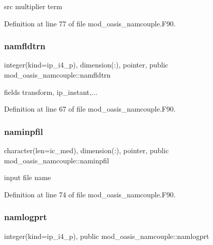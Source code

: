 src multiplier term 



Definition at line 77 of file mod\+\_\+oasis\+\_\+namcouple.\+F90.

\mbox{\label{namespacemod__oasis__namcouple_a5f81bc00e6dc045770edd4093f68278c}} 
\subsubsection{\texorpdfstring{namfldtrn}{namfldtrn}}
{\footnotesize\ttfamily integer(kind=ip\+\_\+i4\+\_\+p), dimension(\+:), pointer, public mod\+\_\+oasis\+\_\+namcouple\+::namfldtrn}



fields transform, ip\+\_\+instant,... 



Definition at line 67 of file mod\+\_\+oasis\+\_\+namcouple.\+F90.

\mbox{\label{namespacemod__oasis__namcouple_a15fc11ff1c1d5718ff127a06a205a82c}} 
\subsubsection{\texorpdfstring{naminpfil}{naminpfil}}
{\footnotesize\ttfamily character(len=ic\+\_\+med), dimension(\+:), pointer, public mod\+\_\+oasis\+\_\+namcouple\+::naminpfil}



input file name 



Definition at line 74 of file mod\+\_\+oasis\+\_\+namcouple.\+F90.

\mbox{\label{namespacemod__oasis__namcouple_a46affda5336f60a1eeb1badaaccd3cfd}} 
\subsubsection{\texorpdfstring{namlogprt}{namlogprt}}
{\footnotesize\ttfamily integer(kind=ip\+\_\+i4\+\_\+p), public mod\+\_\+oasis\+\_\+namcouple\+::namlogprt}



